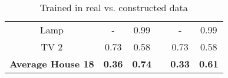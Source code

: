 \begin{table}[H]
\begin{tabular}{c|c|c|c|c|c|}
\cline{5-6}                                       
\multicolumn{1}{|c|}{Lamp} & - & 0.99 & &- & 0.99 \\                   
\cline{1-3}        
\cline{5-6}                                      
\multicolumn{1}{|c|}{TV 2} & 0.73 & 0.58 & & 0.73 & 0.58 \\             
\cline{1-3}        
\cline{5-6}                                        
\multicolumn{1}{|c|}{\textbf{Average House 18} }& \textbf{0.36} & \textbf{0.74} & & \textbf{0.33} & \textbf{0.61} \\
\cline{1-3}        
\cline{5-6}                                       
\end{tabular}                                
\caption{Trained in real vs. constructed data}                     
\label{table:Tab:RealVsCon}                    
\end{table}  